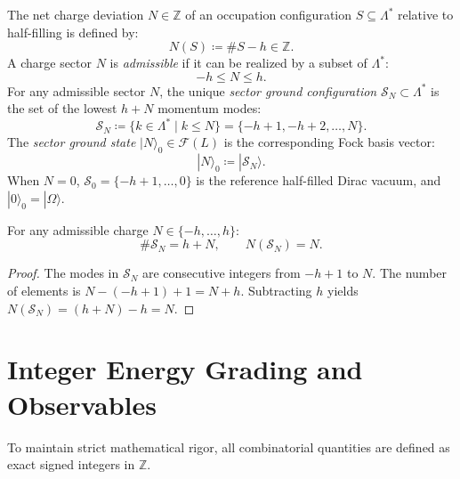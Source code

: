 \begin{definition}
The net charge deviation $N \in \mathbb{Z}$ of an occupation configuration $S \subseteq \Lambda^*$ relative to half-filling is defined by:
\begin{equation}
N(S) \coloneqq \#S - h \in \mathbb{Z}.
\end{equation}
A charge sector $N$ is \emph{admissible} if it can be realized by a subset of $\Lambda^*$:
\begin{equation}
-h \le N \le h.
\end{equation}
For any admissible sector $N$, the unique \emph{sector ground configuration} $\mathcal{S}_N \subset \Lambda^*$ is the set of the lowest $h + N$ momentum modes:
\begin{equation}
\mathcal{S}_N \coloneqq \{ k \in \Lambda^* \mid k \le N \} = \{-h+1, -h+2, \dots, N\}.
\end{equation}
The \emph{sector ground state} $|N\rangle_0 \in \mathcal{F}(L)$ is the corresponding Fock basis vector:
\begin{equation}
|N\rangle_0 \coloneqq |\mathcal{S}_N\rangle.
\end{equation}
When $N = 0$, $\mathcal{S}_0 = \{-h+1, \dots, 0\}$ is the reference half-filled Dirac vacuum, and $|0\rangle_0 = |\Omega\rangle$.
\end{definition}

\begin{lemma}
For any admissible charge $N \in \{-h, \dots, h\}$:
\begin{equation}
\#\mathcal{S}_N = h + N, \qquad N(\mathcal{S}_N) = N.
\end{equation}
\end{lemma}

\begin{proof}
The modes in $\mathcal{S}_N$ are consecutive integers from $-h+1$ to $N$. The number of elements is $N - (-h+1) + 1 = N + h$. Subtracting $h$ yields $N(\mathcal{S}_N) = (h+N) - h = N$.
\end{proof}

\section{Integer Energy Grading and Observables}

To maintain strict mathematical rigor, all combinatorial quantities are defined as exact signed integers in $\mathbb{Z}$.

